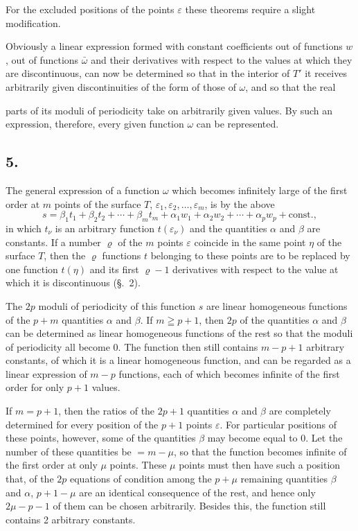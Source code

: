 \documentclass{article}
\begin{document}
For the excluded positions of the points $\varepsilon$ these theorems require a slight modification.

Obviously a linear expression formed with constant coefficients out of functions $w$, out of functions $\bar{\omega}$ and their derivatives with respect to the values at which they are discontinuous, can now be determined so that in the interior of $T'$ it receives arbitrarily given discontinuities of the form of those of $\omega$, and so that the real

parts of its moduli of periodicity take on arbitrarily given values. By such an expression, therefore, every given function $\omega$ can be represented.

\subsection*{5.}

The general expression of a function $\omega$ which becomes infinitely large of the first order at $m$ points of the surface $T$, $\varepsilon_{1}, \varepsilon_{2}, \ldots, \varepsilon_{m}$, is by the above
\[ s = \beta_{1} t_{1} + \beta_{2} t_{2} + \cdots + \beta_{m} t_{m} + \alpha_{1} w_{1} + \alpha_{2} w_{2} + \cdots + \alpha_{p} w_{p} + \text{const.}, \]
in which $t_{\nu}$ is an arbitrary function $t(\varepsilon_{\nu})$ and the quantities $\alpha$ and $\beta$ are constants. If a number $\varrho$ of the $m$ points $\varepsilon$ coincide in the same point $\eta$ of the surface $T$, then the $\varrho$ functions $t$ belonging to these points are to be replaced by one function $t(\eta)$ and its first $\varrho - 1$ derivatives with respect to the value at which it is discontinuous (§.~2).

The $2p$ moduli of periodicity of this function $s$ are linear homogeneous functions of the $p+m$ quantities $\alpha$ and $\beta$. If $m \geqq p+1$, then $2p$ of the quantities $\alpha$ and $\beta$ can be determined as linear homogeneous functions of the rest so that the moduli of periodicity all become 0. The function then still contains $m-p+1$ arbitrary constants, of which it is a linear homogeneous function, and can be regarded as a linear expression of $m-p$ functions, each of which becomes infinite of the first order for only $p+1$ values.

If $m = p+1$, then the ratios of the $2p+1$ quantities $\alpha$ and $\beta$ are completely determined for every position of the $p+1$ points $\varepsilon$. For particular positions of these points, however, some of the quantities $\beta$ may become equal to 0. Let the number of these quantities be $= m-\mu$, so that the function becomes infinite of the first order at only $\mu$ points. These $\mu$ points must then have such a position that, of the $2p$ equations of condition among the $p+\mu$ remaining quantities $\beta$ and $\alpha$, $p+1-\mu$ are an identical consequence of the rest, and hence only $2\mu-p-1$ of them can be chosen arbitrarily. Besides this, the function still contains 2 arbitrary constants.
\end{document}
